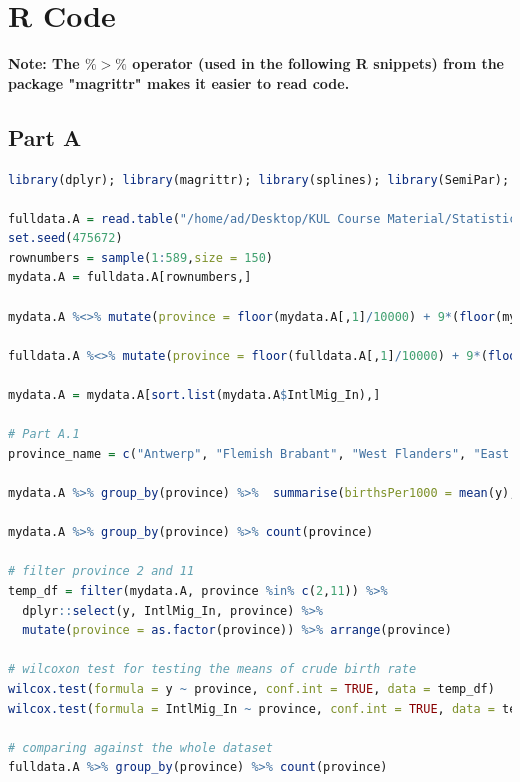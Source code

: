 \documentclass[paper=a4, fontsize=11pt]{scrartcl} %
\numberwithin{equation}{section} %
\begin{document}
\section{R Code}

\textbf{Note: The $\%>\%$ operator (used in the following R snippets) from the package "magrittr" makes it easier to read code.}

\subsection{Part A}

\begin{lstlisting}[language = R, frame = single]
library(dplyr); library(magrittr); library(splines); library(SemiPar); library(mgcv)

fulldata.A = read.table("/home/ad/Desktop/KUL Course Material/Statistical Modelling/Assignment/Examdata2016-A.txt", header = T)
set.seed(475672)
rownumbers = sample(1:589,size = 150)
mydata.A = fulldata.A[rownumbers,]

mydata.A %<>% mutate(province = floor(mydata.A[,1]/10000) + 9*(floor(mydata.A[,1]/1000) == 21) + 8*(floor(mydata.A[,1]/1000) == 25)) 

fulldata.A %<>% mutate(province = floor(fulldata.A[,1]/10000) + 9*(floor(fulldata.A[,1]/1000) == 21) + 8*(floor(fulldata.A[,1]/1000) == 25))

mydata.A = mydata.A[sort.list(mydata.A$IntlMig_In),]

# Part A.1
province_name = c("Antwerp", "Flemish Brabant", "West Flanders", "East Flanders", "Hainaut", "Liege", "Limburg", "Luxembourg", "Namur", "Walloon Brabant", "Brussels")

mydata.A %>% group_by(province) %>%  summarise(birthsPer1000 = mean(y), AvgIntl_in = mean(IntlMig_In))

mydata.A %>% group_by(province) %>% count(province)

# filter province 2 and 11
temp_df = filter(mydata.A, province %in% c(2,11)) %>% 
  dplyr::select(y, IntlMig_In, province) %>% 
  mutate(province = as.factor(province)) %>% arrange(province)

# wilcoxon test for testing the means of crude birth rate
wilcox.test(formula = y ~ province, conf.int = TRUE, data = temp_df)
wilcox.test(formula = IntlMig_In ~ province, conf.int = TRUE, data = temp_df)

# comparing against the whole dataset
fulldata.A %>% group_by(province) %>% count(province)


\end{lstlisting}
\end{document}
